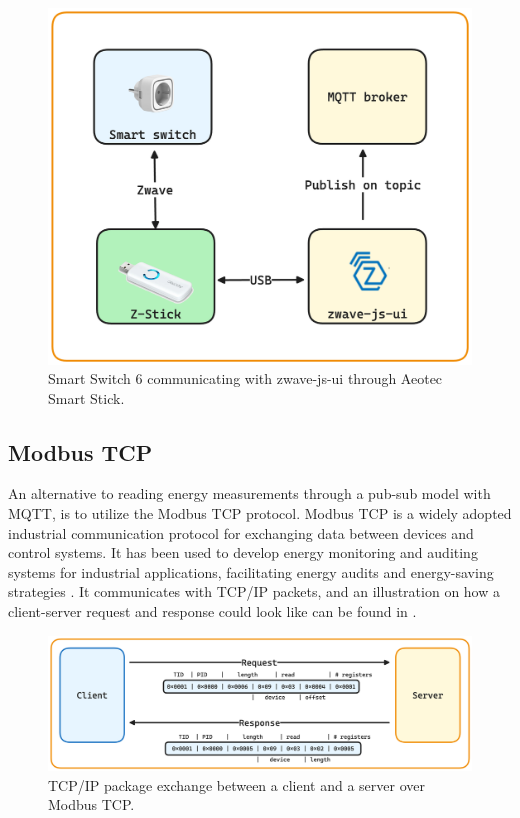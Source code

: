 \documentclass[
  table]{report}
\begin{document}
\begin{figure}[H]
\centering
  \includegraphics[width=0.7\columnwidth]{assets/3-smart-switch.png}
  \caption{Smart Switch 6 communicating with zwave-js-ui through Aeotec Smart Stick.}
  \label{fig:modbus-tcp-gude}
\end{figure}

\subsection{Modbus TCP}
\label{sect:modbus_tcp}

An alternative to reading energy measurements through a pub-sub model
with \ac{MQTT}, is to utilize the Modbus TCP protocol. Modbus TCP is a
widely adopted industrial communication protocol for exchanging data
between devices and control systems. It has been used to develop energy
monitoring and auditing systems for industrial applications,
facilitating energy audits and energy-saving strategies
\citep{tongStudyEthernetCommunication2015}. It communicates with TCP/IP
packets, and an illustration on how a client-server request and response
could look like can be found in .

\begin{figure}[H]
\centering
  \includegraphics{assets/3-modbus-tcp.png}
  \caption{TCP/IP package exchange between a client and a server over Modbus
TCP.}
  \label{fig:modbus-tcp}
\end{figure}
\end{document}
